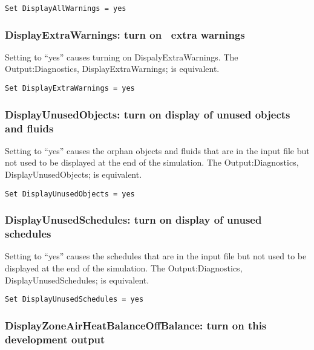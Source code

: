 \begin{lstlisting}
Set DisplayAllWarnings = yes
\end{lstlisting}

\subsubsection{DisplayExtraWarnings: turn on~ extra warnings}\label{displayextrawarnings-turn-on-extra-warnings}

Setting to ``yes'' causes turning on DispalyExtraWarnings. The Output:Diagnostics, DisplayExtraWarnings; is equivalent.

\begin{lstlisting}
Set DisplayExtraWarnings = yes
\end{lstlisting}

\subsubsection{DisplayUnusedObjects: turn on display of unused objects and fluids}\label{displayunusedobjects-turn-on-display-of-unused-objects-and-fluids}

Setting to ``yes'' causes the orphan objects and fluids that are in the input file but not used to be displayed at the end of the simulation. The Output:Diagnostics, DisplayUnusedObjects; is equivalent.

\begin{lstlisting}
Set DisplayUnusedObjects = yes
\end{lstlisting}

\subsubsection{DisplayUnusedSchedules: turn on display of unused schedules}\label{displayunusedschedules-turn-on-display-of-unused-schedules}

Setting to ``yes'' causes the schedules that are in the input file but not used to be displayed at the end of the simulation. The Output:Diagnostics, DisplayUnusedSchedules; is equivalent.

\begin{lstlisting}
Set DisplayUnusedSchedules = yes
\end{lstlisting}

\subsubsection{DisplayZoneAirHeatBalanceOffBalance: turn on this development output}\label{displayzoneairheatbalanceoffbalance-turn-on-this-development-output}

